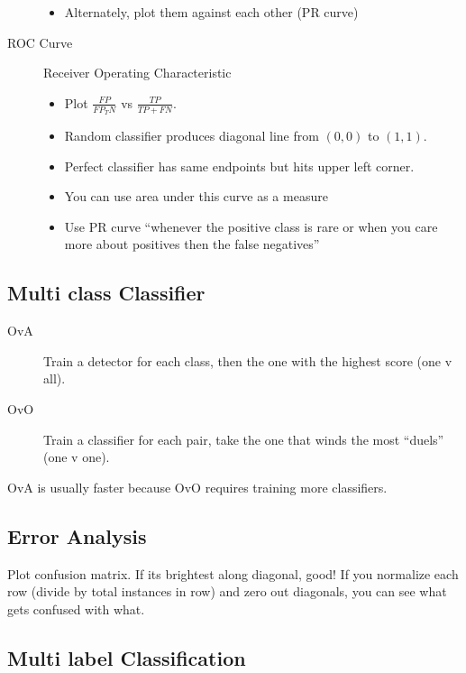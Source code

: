 \documentclass[10pt]{article}
\begin{document}
\begin{description}
\begin{itemize}
      \item Alternately, plot them against each other (PR curve)
    \end{itemize}
  \item[ROC Curve]
    Receiver Operating Characteristic
    \begin{itemize}
      \item Plot \(\frac{FP}{FP_TN}\) vs \(\frac{TP}{TP+FN}\).
      \item Random classifier produces diagonal line from $(0,0)$ to $(1,1)$.
      \item Perfect classifier has same endpoints but hits upper left corner.
      \item You can use area under this curve as a measure
      \item Use PR curve ``whenever the positive class is rare or when you care
        more about positives then the false negatives''
    \end{itemize}
\end{description}

\subsection{Multi class Classifier}%
\label{sub:multiclass_classifier}

\begin{description}
  \item[OvA] Train a detector for each class, then the one with the highest
    score (one v all).
  \item[OvO] Train a classifier for each pair, take the one that winds the most
    ``duels'' (one v one).
\end{description}

OvA is usually faster because OvO requires training more classifiers.

\subsection{Error Analysis}%
\label{sub:error_analysis}

Plot confusion matrix. If its brightest along diagonal, good! If you normalize
each row (divide by total instances in row) and zero out diagonals, you can see
what gets confused with what.

\subsection{Multi label Classification}%
\label{sub:multilabel_classification}
\end{document}
